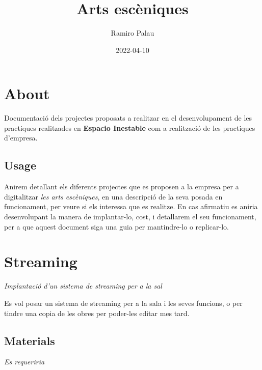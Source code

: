 \documentclass[
  10pt,
]{book}
\title{Arts escèniques}
\author{Ramiro Palau}
\date{2022-04-10}
\begin{document}
\maketitle

{
\setcounter{tocdepth}{1}
\tableofcontents
}
\hypertarget{about}{%
\chapter*{About}\label{about}}

Documentació dels projectes proposats a realitzar en el desenvolupament de les practiques realitzades en \textbf{Espacio Inestable} com a realització de les practiques d'empresa.

\hypertarget{usage}{%
\section*{Usage}\label{usage}}

Anirem detallant els diferents projectes que es proposen a la empresa per a digitalitzar \emph{les arts escèniques}, en una descripció de la seva posada en funcionament, per veure si els interessa que es realitze. En cas afirmatiu es aniria desenvolupant la manera de implantar-lo, cost, i detallarem el seu funcionament, per a que aquest document siga una guia per mantindre-lo o replicar-lo.

\hypertarget{streaming}{%
\chapter{Streaming}\label{streaming}}

\emph{Implantació d'un sistema de streaming per a la sal}

Es vol posar un sistema de streaming per a la sala i les seves funcions, o per tindre una copia de les obres per poder-les editar mes tard.

\hypertarget{materials}{%
\section{Materials}\label{materials}}

\emph{Es requeriria}
\end{document}
